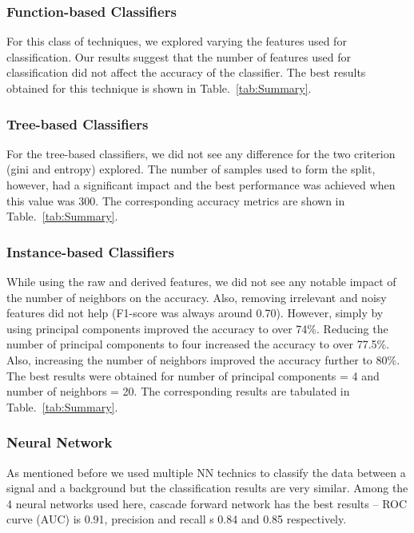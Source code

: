 \subsubsection{Function-based Classifiers}

For this class of techniques, we explored varying the features used for classification. Our results suggest that the number of features used for classification did not affect the accuracy of the classifier. The best results obtained for this technique is shown in Table.~\ref{tab:Summary}.

\subsubsection{Tree-based Classifiers}

For the tree-based classifiers, we did not see any difference for the two criterion (gini and entropy) explored. The number of samples used to form the split, however, had a significant impact and the best performance was achieved when this value was 300. The corresponding accuracy metrics are shown in Table.~\ref{tab:Summary}.

\subsubsection{Instance-based Classifiers}

While using the raw and derived features, we did not see any notable impact of the number of neighbors on the accuracy. Also, removing irrelevant and noisy features did not help (F1-score was always around 0.70). However, simply by using principal components improved the accuracy to over 74\%. Reducing the number of principal components to four increased the accuracy to over 77.5\%. Also, increasing the number of neighbors improved the accuracy further to 80\%. The best results were obtained for number of principal components = 4 and number of neighbors = 20. The corresponding results are tabulated in Table.~\ref{tab:Summary}.

\subsubsection{Neural Network}
As mentioned before we used multiple NN technics to classify the data between a signal and a background but the classification results are very similar. Among the 4 neural networks used here, cascade forward network has the best results --  ROC curve (AUC) is 0.91, precision and recall s 0.84 and 0.85 respectively.  

